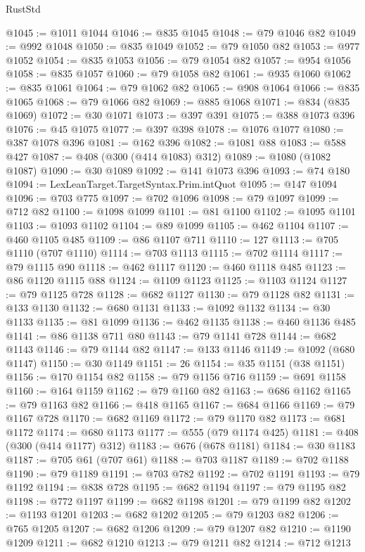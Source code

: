 \begin{lexlean}{RustStd}
\begin{coremodule}
{\begin{coremodule}
{{{{{{{{{{{{{{{{{{{{{{{{{{{{{{{@1045 := @1011 @1044
@1046 := @835 @1045
@1048 := @79 @1046 @82
@1049 := @992 @1048
@1050 := @835 @1049
@1052 := @79 @1050 @82
@1053 := @977 @1052
@1054 := @835 @1053
@1056 := @79 @1054 @82
@1057 := @954 @1056
@1058 := @835 @1057
@1060 := @79 @1058 @82
@1061 := @935 @1060
@1062 := @835 @1061
@1064 := @79 @1062 @82
@1065 := @908 @1064
@1066 := @835 @1065
@1068 := @79 @1066 @82
@1069 := @885 @1068
@1071 := @834 (@835 @1069)
@1072 := @30 @1071
@1073 := @397 @391
@1075 := @388 @1073 @396
@1076 := @45 @1075
@1077 := @397 @398
@1078 := @1076 @1077
@1080 := @387 @1078 @396
@1081 := @162 @396
@1082 := @1081 @88
@1083 := @588 @427
@1087 := @408 (@300 (@414 @1083) @312)
@1089 := @1080 (@1082 @1087)
@1090 := @30 @1089
@1092 := @141 @1073 @396
@1093 := @74 @180
@1094 := LexLeanTarget.TargetSyntax.Prim.intQuot
@1095 := @147 @1094
@1096 := @703 @775
@1097 := @702 @1096
@1098 := @79 @1097
@1099 := @712 @82
@1100 := @1098 @1099
@1101 := @81 @1100
@1102 := @1095 @1101
@1103 := @1093 @1102
@1104 := @89 @1099
@1105 := @462 @1104
@1107 := @460 @1105 @485
@1109 := @86 @1107 @711
@1110 := 127
@1113 := @705 @1110 (@707 @1110)
@1114 := @703 @1113
@1115 := @702 @1114
@1117 := @79 @1115 @90
@1118 := @462 @1117
@1120 := @460 @1118 @485
@1123 := @86 @1120 @1115 @88
@1124 := @1109 @1123
@1125 := @1103 @1124
@1127 := @79 @1125 @728
@1128 := @682 @1127
@1130 := @79 @1128 @82
@1131 := @133 @1130
@1132 := @680 @1131
@1133 := @1092 @1132
@1134 := @30 @1133
@1135 := @81 @1099
@1136 := @462 @1135
@1138 := @460 @1136 @485
@1141 := @86 @1138 @711 @80
@1143 := @79 @1141 @728
@1144 := @682 @1143
@1146 := @79 @1144 @82
@1147 := @133 @1146
@1149 := @1092 (@680 @1147)
@1150 := @30 @1149
@1151 := 26
@1154 := @35 @1151 (@38 @1151)
@1156 := @170 @1154 @82
@1158 := @79 @1156 @716
@1159 := @691 @1158
@1160 := @164 @1159
@1162 := @79 @1160 @82
@1163 := @686 @1162
@1165 := @79 @1163 @82
@1166 := @418 @1165
@1167 := @684 @1166
@1169 := @79 @1167 @728
@1170 := @682 @1169
@1172 := @79 @1170 @82
@1173 := @681 @1172
@1174 := @680 @1173
@1177 := @555 (@79 @1174 @425)
@1181 := @408 (@300 (@414 @1177) @312)
@1183 := @676 (@678 @1181)
@1184 := @30 @1183
@1187 := @705 @61 (@707 @61)
@1188 := @703 @1187
@1189 := @702 @1188
@1190 := @79 @1189
@1191 := @703 @782
@1192 := @702 @1191
@1193 := @79 @1192
@1194 := @838 @728
@1195 := @682 @1194
@1197 := @79 @1195 @82
@1198 := @772 @1197
@1199 := @682 @1198
@1201 := @79 @1199 @82
@1202 := @1193 @1201
@1203 := @682 @1202
@1205 := @79 @1203 @82
@1206 := @765 @1205
@1207 := @682 @1206
@1209 := @79 @1207 @82
@1210 := @1190 @1209
@1211 := @682 @1210
@1213 := @79 @1211 @82
@1214 := @712 @1213
}}}}}}}}}}}}}}}}}}}}}}}}}}}}}}}
\end{coremodule}}
\end{coremodule}
\end{lexlean}
